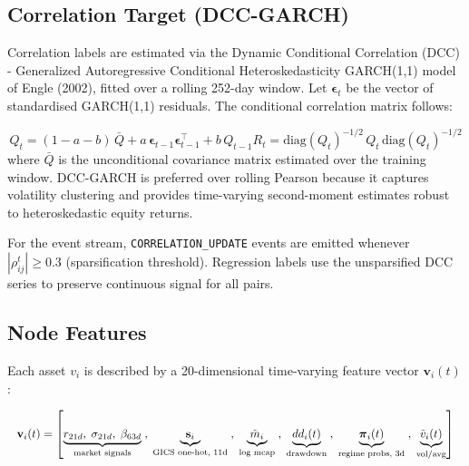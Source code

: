 \documentclass[runningheads]{llncs}
\begin{document}
\subsection{Correlation Target (DCC-GARCH)}\label{correlation-target-dcc-garch-1}

Correlation labels are estimated via the Dynamic Conditional Correlation (DCC) - Generalized Autoregressive Conditional Heteroskedasticity GARCH(1,1) model of Engle (2002), fitted over a rolling 252-day window. Let $\boldsymbol{\epsilon}_t$ be the vector of standardised GARCH(1,1) residuals. The conditional correlation matrix follows:

\begin{subequations}
\begin{equation}
Q_t = (1 - a - b)\,\bar{Q} + a\,\boldsymbol{\epsilon}_{t-1}\boldsymbol{\epsilon}_{t-1}^\top + b\,Q_{t-1}
\end{equation}
\begin{equation}
R_t = \mathrm{diag}(Q_t)^{-1/2}\,Q_t\,\mathrm{diag}(Q_t)^{-1/2}
\end{equation}
\end{subequations}
where $\bar{Q}$ is the unconditional covariance matrix estimated over the training window. DCC-GARCH is preferred over rolling Pearson because it captures volatility clustering and provides time-varying second-moment estimates robust to heteroskedastic equity returns.

For the event stream, \texttt{CORRELATION\_UPDATE} events are emitted whenever $|\rho_{ij}^t| \geq 0.3$ (sparsification threshold). Regression labels use the unsparsified DCC series to preserve continuous
signal for all pairs. 

\subsection{Node Features}\label{node-features-1}

Each asset $v_i$ is described by a 20-dimensional time-varying feature vector $\mathbf{v}_i(t)$:

\[\scalebox{0.90}{$
\mathbf{v}_i(t) = \left[\underbrace{r_{21d},\; \sigma_{21d},\; \beta_{63d}}_{\text{market signals}}\;,\;\underbrace{\mathbf{s}_i}_{\text{GICS one-hot, 11d}}\;,\;\underbrace{\tilde{m}_i}_{\text{log mcap}}\;,\;\underbrace{dd_i(t)}_{\text{drawdown}}\;,\;\underbrace{\boldsymbol{\pi}_i(t)}_{\text{regime probs, 3d}}\;,\;\underbrace{\tilde{v}_i(t)}_{\text{vol/avg}}\right]$}\]

\end{document}
